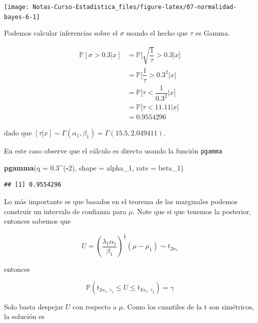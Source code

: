 \documentclass[
  12pt,
]{book}
\newenvironment{Shaded}{\begin{snugshade}}{\end{snugshade}}
\newcommand{\DataTypeTok}[1]{\textcolor[rgb]{0.13,0.29,0.53}{#1}}
\newcommand{\DecValTok}[1]{\textcolor[rgb]{0.00,0.00,0.81}{#1}}
\newcommand{\FloatTok}[1]{\textcolor[rgb]{0.00,0.00,0.81}{#1}}
\newcommand{\KeywordTok}[1]{\textcolor[rgb]{0.13,0.29,0.53}{\textbf{#1}}}
\newcommand{\NormalTok}[1]{#1}
\newcommand{\OperatorTok}[1]{\textcolor[rgb]{0.81,0.36,0.00}{\textbf{#1}}}
\begin{document}
\begin{center}\texttt{[image: Notas-Curso-Estadistica\_files/figure-latex/07-normalidad-bayes-6-1]} \end{center}

Podemos calcular inferencias sobre el \(\sigma\) usando el hecho que \(\tau\)
es Gamma.

\begin{align*}
\mathbb P[\sigma>0.3|x] & = \mathbb P\bigg[\sqrt{\dfrac 1\tau} >0.3\bigg|x\bigg]\\
& = \mathbb P\bigg[\dfrac 1\tau >0.3^2\bigg|x\bigg]\\ 
& = \mathbb P\bigg[\tau <\dfrac 1{0.3^2}\bigg|x\bigg] \\ 
& = \mathbb P\bigg[\tau <11.11\bigg|x\bigg] \\ 
&=0.9554296
\end{align*}

dado que \([\tau|x] \sim \Gamma(\alpha_1,\beta_1) = \Gamma(15.5,2.049411)\).

En este caso observe que el cálculo es directo usando la función \texttt{pgamma}

\begin{Shaded}
\begin{Highlighting}[]
\KeywordTok{pgamma}\NormalTok{(}\DataTypeTok{q =} \FloatTok{0.3}\OperatorTok{\^{}}\NormalTok{(}\OperatorTok{{-}}\DecValTok{2}\NormalTok{), }\DataTypeTok{shape =}\NormalTok{ alpha\_}\DecValTok{1}\NormalTok{, }\DataTypeTok{rate =}\NormalTok{ beta\_}\DecValTok{1}\NormalTok{)}
\end{Highlighting}
\end{Shaded}

\begin{verbatim}
## [1] 0.9554296
\end{verbatim}

Lo más importante es que basados en el teorema de las marginales podemos
construir un intervalo de confianza para \(\mu\). Note que si que tenemos la
posterior, entonces sabemos que

\[U = \left(\dfrac{\lambda_1\alpha_1}{\beta_1}\right)^{\frac 12}(\mu-\mu_1) \sim t_{2\alpha_1} \]

entonces

\begin{equation*}
\mathbb P \left(t_{2\alpha_1, \gamma_1} \leq U \leq t_{2\alpha_1,
\gamma_2}\right) = \gamma
\end{equation*}

Solo basta despejar \(U\) con respecto a \(\mu\). Como los cuantiles de la t son
simétricos, la solución es
\end{document}
